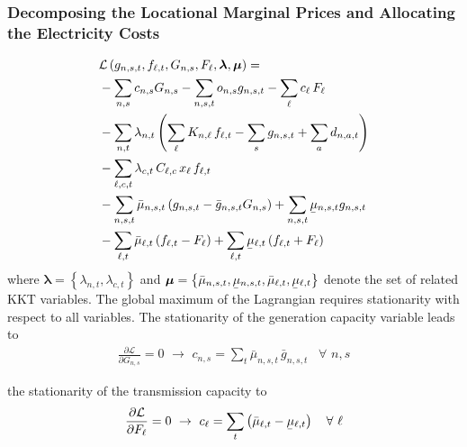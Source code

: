 \documentclass[11pt,twocolumn]{article}
\newcommand{\ubar}[1]{\underaccent{\bar}{#1}}
\newcommand{\generation}[1][n]{g_{#1,s,t}}
\newcommand{\generationpotential}{\bar{g}_{n,s,t}}
\newcommand{\capacityGeneration}{G_{n,s}}
\newcommand{\capacityFlow}{F_{\ell}}
\newcommand{\capexGeneration}{c_{n,s}}
\newcommand{\capexFlow}{c_{\ell}}
\newcommand{\opexGeneration}[1][n]{o_{#1,s}}
\newcommand{\demand}[1][n]{d_{#1,a,t}}
\newcommand{\incidence}[1][n]{K_{#1,\ell}}
\newcommand{\mulowergeneration}[1][n]{\ubar{\mu}_{#1,s,t}}
\newcommand{\muuppergeneration}[1][n]{\bar{\mu}_{#1,s,t}}
\newcommand{\mulowerflow}{\ubar{\mu}_{\ell,t}}
\newcommand{\muupperflow}{\bar{\mu}_{\ell,t}}
\newcommand{\lmp}[1][n]{\lambda_{#1,t}}
\newcommand{\flow}{f_{\ell,t}}
\newcommand{\cycle}{C_{\ell,c}}
\newcommand{\impedance}{x_\ell}
\newcommand{\cycleprice}{\lambda_{c,t}}
\newcommand{\lagrangian}{\mathcal{L}}
\newcommand{\Forall}[1]{\hspace{10pt} \forall \,\, #1 }
\newcommand{\pdv}[2]{\frac{\partial #1}{\partial #2}}
\begin{document}
\subsubsection*{Decomposing the Locational Marginal Prices and Allocating the Electricity Costs}
\begin{align}
\notag
 & \lagrangian\left(\generation, \flow, \capacityGeneration, \capacityFlow, \boldsymbol{\lambda}, \boldsymbol{\mu} \right)   =   \\  
 \notag
 & - \sum_{n,s} \capexGeneration \capacityGeneration - \sum_{n, s, t} \opexGeneration \generation - \sum_{\ell} \capexFlow \, \capacityFlow  \\
 \notag
 &- \sum_{n,t} \lmp \left(\sum_\ell \incidence \, \flow  - \sum_s \generation + \sum_a \demand  \right)  \\ 
 \notag
 &- \sum_{\ell,c,t} \cycleprice \, \cycle \, \impedance \, \flow  \\
 \notag
 &- \sum_{n,s,t} \muuppergeneration \left( \generation - \generationpotential \capacityGeneration \right)  + \sum_{n,s,t} \mulowergeneration \generation  \\
 &- \sum_{\ell,t} \muupperflow \left( \flow - \capacityFlow \right) + \sum_{\ell,t} \mulowerflow \left( \flow + \capacityFlow \right)     
 \label{eq:full_lagrangian}
\end{align}
% 
where $\boldsymbol{\lambda} = \left\lbrace \lmp, \cycleprice \right\rbrace $ and $\boldsymbol{\mu} = \left\lbrace \muuppergeneration, \mulowergeneration, \muupperflow, \mulowerflow \right\rbrace $ denote the set of related KKT variables. The global maximum of the Lagrangian requires stationarity with respect to all variables. The stationarity of the generation capacity variable leads to 
\begin{align}
 \pdv{\lagrangian}{\capacityGeneration}  = 0 \,\, \rightarrow \,\, 
 \capexGeneration =  \sum_t \muuppergeneration \, \generationpotential  \Forall{n,s}
 \label{eq:capexGeneration_duality}
\end{align}

the stationarity of the transmission capacity to
\begin{align}
 \pdv{\lagrangian}{\capacityFlow} = 0 \,\, \rightarrow \,\, 
 \capexFlow =  \sum_t \left( \muupperflow - \mulowerflow \right) \Forall{\ell}
 \label{eq:capexFlow_duality}
\end{align}
\end{document}
